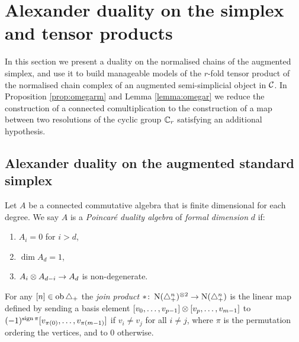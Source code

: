 
\section{Alexander duality on the simplex and tensor products}\label{s:3complexes}


In this section we present a duality on the normalised chains of the augmented simplex, and use it to build manageable models of the $r$-fold tensor product of the normalised chain complex of an augmented semi-simplicial object in $\mathcal{C}$. In Proposition \ref{prop:omegarm} and Lemma \ref{lemma:omegar} we reduce the construction of a connected comultiplication to the construction of a map between two resolutions of the cyclic group $\mathbb{C}_r$ satisfying an additional hypothesis. 

\subsection{Alexander duality on the augmented standard simplex} 


 


\begin{definition}\label{d:poincare_duality_algebra}
	Let $A$ be a connected commutative algebra that is finite dimensional for each degree.
	We say $A$ is a \textit{Poincar\'e duality algebra} of \textit{formal dimension} $d$ if:
	\begin{enumerate}
		\item\label{i:pd1} $A_i = 0$ for $i > d$,
		\item\label{i:pd2} $\dim A_d = 1$,
		\item\label{i:pd3} $A_i \otimes A_{d-i} \to A_d$ is non-degenerate.
	\end{enumerate}
\end{definition}

\begin{definition}\label{d:join_product}
	For any $[n] \in \operatorname{ob}\triangle_{+}$ the \textit{join product} $\ast \colon \operatorname{N}(\triangle_{+}^{n})^{\otimes 2} \to \operatorname{N}(\triangle_{+}^{n})$ is the linear map defined by sending a basis element $[v_0, \dots, v_{p-1}] \otimes [v_{p},\dots,v_{m-1}]$ to $(-1)^{\operatorname{sign} \pi}[v_{\pi(0)}, \dots, v_{\pi(m-1)}]$	if $v_i \neq v_j$ for all $i \neq j$, where $\pi$ is the permutation ordering the vertices, and to $0$ otherwise.
\end{definition}

